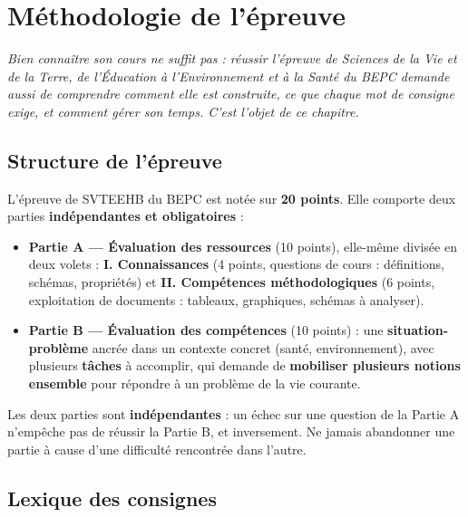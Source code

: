 \chapter{Méthodologie de l'épreuve}

\noindent\textit{Bien connaître son cours ne suffit pas : réussir l'épreuve de
Sciences de la Vie et de la Terre, de l'Éducation à l'Environnement et à la Santé du
BEPC demande aussi de comprendre comment elle est construite, ce que chaque mot de
consigne exige, et comment gérer son temps. C'est l'objet de ce chapitre.}
\vspace{8pt}

\section{Structure de l'épreuve}

\begin{propriete}
L'épreuve de SVTEEHB du BEPC est notée sur \textbf{20 points}. Elle comporte deux
parties \textbf{indépendantes et obligatoires} :
\begin{itemize}
\item \textbf{Partie A — Évaluation des ressources} (10 points), elle-même divisée en
deux volets : \textbf{I. Connaissances} (4 points, questions de cours : définitions,
schémas, propriétés) et \textbf{II. Compétences méthodologiques} (6 points, exploitation
de documents : tableaux, graphiques, schémas à analyser).
\item \textbf{Partie B — Évaluation des compétences} (10 points) : une
\textbf{situation-problème} ancrée dans un contexte concret (santé, environnement),
avec plusieurs \textbf{tâches} à accomplir, qui demande de \textbf{mobiliser plusieurs
notions ensemble} pour répondre à un problème de la vie courante.
\end{itemize}
\end{propriete}

\begin{remarque}
Les deux parties sont \textbf{indépendantes} : un échec sur une question de la Partie
A n'empêche pas de réussir la Partie B, et inversement. Ne jamais abandonner une
partie à cause d'une difficulté rencontrée dans l'autre.
\end{remarque}

\section{Lexique des consignes}

